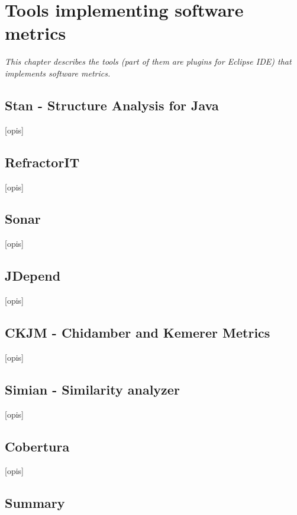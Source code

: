 \chapter{Tools implementing software metrics} \label{roz:metrics-tools}

\textit{This chapter describes the tools (part of them are plugins for Eclipse IDE) that implements software metrics.} 

\section{Stan - Structure Analysis for Java} 
[opis]
\section{RefractorIT}
[opis]
\section{Sonar}
[opis]
\section{JDepend}
[opis]
\section{CKJM - Chidamber and Kemerer Metrics}
[opis]
\section{Simian - Similarity analyzer}
[opis]
\section{Cobertura}
[opis]

\section{Summary}
